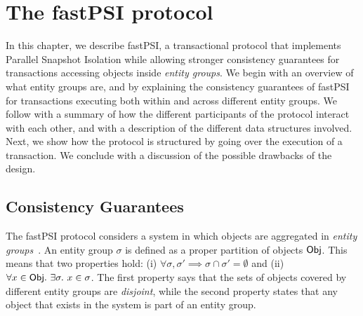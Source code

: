 \cleardoublepage
\chapter{The fastPSI protocol}
\label{chapter:protocol}





In this chapter, we describe fastPSI, a transactional protocol that implements Parallel Snapshot Isolation while allowing stronger consistency guarantees for transactions accessing objects inside \emph{entity groups}. We begin with an overview of what entity groups are, and by explaining the consistency guarantees of fastPSI for transactions executing both within and across different entity groups. We follow with a summary of how the different participants of the protocol interact with each other, and with a description of the different data structures involved. Next, we show how the protocol is structured by going over the execution of a transaction. We conclude with a discussion of the possible drawbacks of the design.

\section{Consistency Guarantees}

The fastPSI protocol considers a system in which objects are aggregated in \emph{entity groups}~\citep{baker_megastore}. An entity group $\sigma$ is defined as a proper partition of objects ${\sf Obj}$. This means that two properties hold: (i) $\forall \sigma, \sigma' \implies \sigma \cap \sigma' = \emptyset$ and (ii) $\forall x \in {\sf Obj} .\ \exists \sigma .\ x \in \sigma$. The first property says that the sets of objects covered by different entity groups are \emph{disjoint}, while the second property states that any object that exists in the system is part of an entity group.

